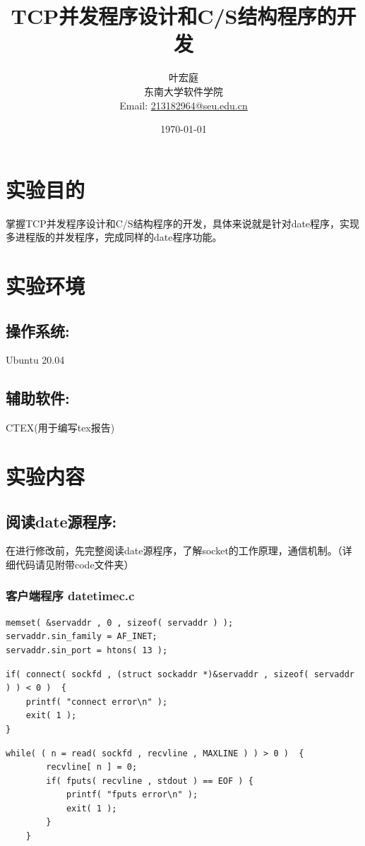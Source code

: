 \documentclass[UTF8]{ctexart}
\author{\small{\kaishu 71118415 叶宏庭}\\[2pt]
\small{\kaishu 东南大学软件学院}\\[2pt]
\small{Email:}
\url{213182964@seu.edu.cn}
}
\title{\Huge{\heiti TCP并发程序设计和C/S结构程序的开发}}
\date{\today} %
\begin{document}
\maketitle

\section{实验目的}{掌握TCP并发程序设计和C/S结构程序的开发，具体来说就是针对date程序，实现多进程版的并发程序，完成同样的date程序功能。}

\section{实验环境}
\subsection{操作系统:}{Ubuntu 20.04}
\subsection{辅助软件:}{CTEX(用于编写tex报告)}
\section{实验内容}
\subsection{阅读date源程序:}{在进行修改前，先完整阅读date源程序，了解socket的工作原理，通信机制。（详细代码请见附带code文件夹）}
\subsubsection{客户端程序 datetimec.c}
\begin{lstlisting}
memset( &servaddr , 0 , sizeof( servaddr ) );
servaddr.sin_family = AF_INET;
servaddr.sin_port = htons( 13 );

\end{lstlisting}

\begin{lstlisting}
if( connect( sockfd , (struct sockaddr *)&servaddr , sizeof( servaddr ) ) < 0 )  {
	printf( "connect error\n" );
	exit( 1 );
}
\end{lstlisting}

\begin{lstlisting}
while( ( n = read( sockfd , recvline , MAXLINE ) ) > 0 )  {
		recvline[ n ] = 0;
		if( fputs( recvline , stdout ) == EOF ) {
			printf( "fputs error\n" );
			exit( 1 );
		}
	}
\end{lstlisting}
\end{document}
